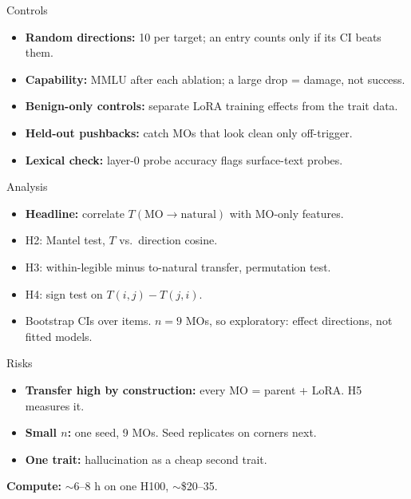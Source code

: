 \documentclass[aspectratio=169,11pt]{beamer}
\begin{document}
\begin{frame}{Controls}
  \begin{itemize}
    \item \textbf{Random directions:} 10 per target; an entry counts only if its CI beats them.
    \item \textbf{Capability:} MMLU after each ablation; a large drop = damage, not success.
    \item \textbf{Benign-only controls:} separate LoRA training effects from the trait data.
    \item \textbf{Held-out pushbacks:} catch MOs that look clean only off-trigger.
    \item \textbf{Lexical check:} layer-0 probe accuracy flags surface-text probes.
  \end{itemize}
\end{frame}

\begin{frame}{Analysis}
  \begin{itemize}
    \item \textbf{Headline:} correlate $T(\text{MO}\to\text{natural})$ with MO-only features.
    \item H2: Mantel test, $T$ vs.\ direction cosine.
    \item H3: within-legible minus to-natural transfer, permutation test.
    \item H4: sign test on $T(i,j) - T(j,i)$.
    \item Bootstrap CIs over items. $n = 9$ MOs, so exploratory: effect directions, not fitted models.
  \end{itemize}
\end{frame}

\begin{frame}{Risks}
  \begin{itemize}
    \item \textbf{Transfer high by construction:} every MO = parent + LoRA. H5 measures it.
    \item \textbf{Small $n$:} one seed, 9 MOs. Seed replicates on corners next.
    \item \textbf{One trait:} hallucination as a cheap second trait.
  \end{itemize}
  \vspace{0.5em}
  \textbf{Compute:} $\sim$6--8 h on one H100, $\sim$\$20--35.
\end{frame}
\end{document}
